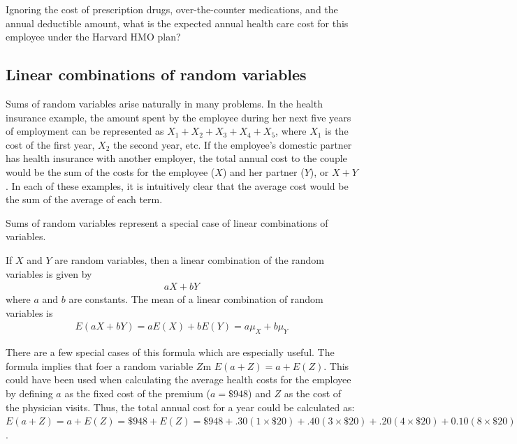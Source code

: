 \begin{example} {Ignoring the cost of prescription drugs, over-the-counter medications, and the annual deductible amount, what is the expected annual health care cost for this employee under the Harvard HMO plan?}
\end{example}


\subsection{Linear combinations of random variables}

Sums of random variables arise naturally in many problems. In the health insurance example, the amount spent by the employee during her next five years of employment can be represented as $X_1 + X_2 + X_3 + X_4 + X_5$, where $X_1$ is the cost of the first year, $X_2$ the second year, etc. If the employee's domestic partner has health insurance with another employer, the total annual cost to the couple would be the sum of the costs for the employee ($X$) and her partner ($Y$), or $X + Y$. In each of these examples, it is intuitively clear that the average cost would be the sum of the average of each term.

Sums of random variables represent a special case of linear combinations of variables.  

\begin{termBox}{
If $X$ and $Y$ are random variables, then a linear combination of the random variables is given by
\begin{align}\label{linComboOfRandomVariablesXAndY}
aX + bY
\end{align}
where $a$ and $b$ are constants.  The mean of a linear combination of random variables is 
\begin{align*}
 E(aX + bY) = aE(X) + bE(Y) = a\mu_X + b\mu_Y
\end{align*}}
\end{termBox}

There are a few special cases of this formula which are especially useful. The formula implies that foer a random variable $Z$m $E(a + Z) = a + E(Z)$.  This could have been used when calculating the average health costs for the employee by defining $a$ as the fixed cost of the premium ($a=\$948$) and $Z$ as the cost of the physician visits. Thus, the total annual cost for a year could be calculated as: $E(a + Z) = a + E(Z) = \$948 + E(Z) = \$948 + .30(1 \times \$20) + .40(3 \times \$20) + .20(4 \times \$20) + 0.10(8 \times \$20)= \$1,010.00$. 

